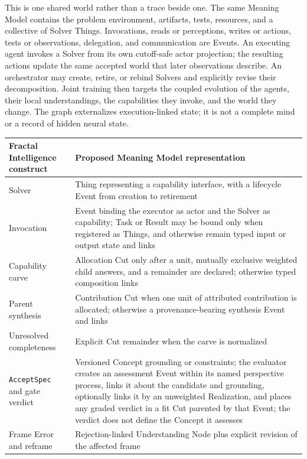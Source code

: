 \documentclass[10pt]{article}
\begin{document}
This is one shared world rather than a trace beside one. The same Meaning Model
contains the problem environment, artifacts, tests, resources, and a collective
of Solver Things. Invocations, reads or perceptions, writes or actions, tests
or observations, delegation, and communication are Events. An executing agent
invokes a Solver from its own cutoff-safe actor projection; the resulting
actions update the same accepted world that later observations describe.
An orchestrator may create, retire, or
rebind Solvers and explicitly revise their decomposition. Joint training then
targets the coupled evolution of the agents, their local understandings, the
capabilities they invoke, and the world they change. The graph externalizes execution-linked state; it is
not a complete mind or a record of hidden neural state.

\begin{table}[H]
\centering
\scriptsize
\begin{tabularx}{\textwidth}{@{}p{}Y@{}}
\toprule
Fractal Intelligence construct & Proposed Meaning Model representation \\
\midrule
Solver & Thing representing a capability interface, with a lifecycle Event from creation to retirement \\
Invocation & Event binding the executor as actor and the Solver as capability; Task or Result may be bound only when registered as Things, and otherwise remain typed input or output state and links \\
Capability carve & Allocation Cut only after a unit, mutually exclusive weighted child answers, and a remainder are declared; otherwise typed composition links \\
Parent synthesis & Contribution Cut when one unit of attributed contribution is allocated; otherwise a provenance-bearing synthesis Event and links \\
Unresolved completeness & Explicit Cut remainder when the carve is normalized \\
\texttt{AcceptSpec} and gate verdict & Versioned Concept grounding or constraints; the evaluator creates an assessment Event within its named perspective process, links it about the candidate and grounding, optionally links it by an unweighted Realization, and places any graded verdict in a fit Cut parented by that Event; the verdict does not define the Concept it assesses \\
Frame Error and reframe & Rejection-linked Understanding Node plus explicit revision of the affected frame \\

\end{tabularx}
\end{table}
\end{document}
